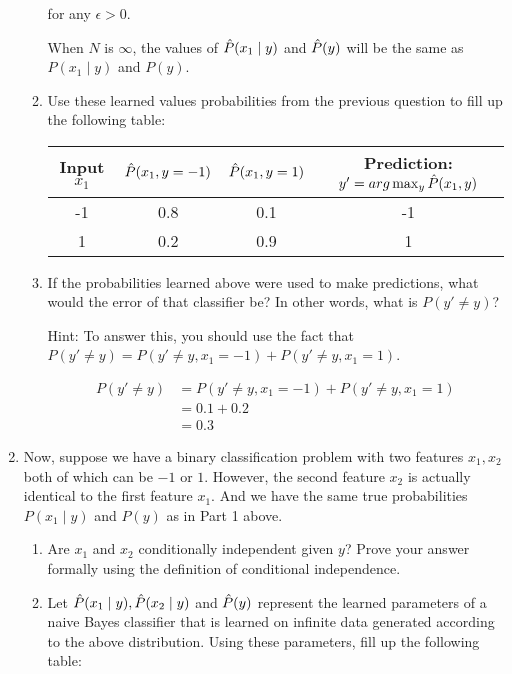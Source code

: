\begin{enumerate}
\begin{enumerate}
for any $\epsilon > 0$.

When $N$ is $\infty$, the values of $\hat{P}(x_1 \mid y)$ and $\hat{P}(y)$ will be the same as $P(x_1 \mid y)$ and $P(y)$.
    
  \item \relax[6 points] Use these learned values probabilities from
    the previous question to fill up the following table:

    \begin{tabular}{|c|c|c|c|}
      \hline
      {\bf Input $x_1$} & $\hat{P}(x_1, y= -1)$ & $\hat{P}(x_1, y=1)$ & {\bf Prediction: $y' = arg\max_y \hat{P}(x_1, y)$} \\
      \hline
      -1                & 0.8                   &   0.1              &  -1                                 \\
      1                 &  0.2                 &  0.9               &   1                                \\
      \hline
    \end{tabular}

  \item \relax[3 points] If the probabilities learned above were used to
    make predictions, what would the error of that classifier be? In
    other words, what is $P(y' \ne y)$? 

    Hint: To answer this, you should use the fact that
    $P(y' \ne y) = P(y' \ne y, x_1 = -1) + P(y' \ne y, x_1 = 1)$.

\begin{equation*}
\begin{aligned}
P(y' \ne y) &= P(y' \ne y, x_1 = -1) + P(y' \ne y, x_1 = 1)\\
&= 0.1+ 0.2\\
&= 0.3
\end{aligned}
\end{equation*} 

  \end{enumerate}

\item \relax[Part 2] Now, suppose we have a binary classification
  problem with two features $x_1, x_2$ both of which can be $-1$ or
  $1$. However, the second feature $x_2$ is actually identical to the
  first feature $x_1$. And we have the same true probabilities
  $P(x_1 \mid y)$ and $P(y)$ as in Part 1 above.

  \begin{enumerate}
  \item \relax[1 point] Are $x_1$ and $x_2$ conditionally independent
    given $y$? Prove your answer formally using the definition of
    conditional independence.
  \item \relax[8 points] Let $\hat{P}(x_1 \mid y), \hat{P}(x_2 \mid y)$ and
    $\hat{P}(y)$ represent the learned parameters of a naive Bayes
    classifier that is learned on infinite data generated according to
    the above distribution. Using these parameters, fill up the
    following table:



\end{enumerate}
\end{enumerate}
